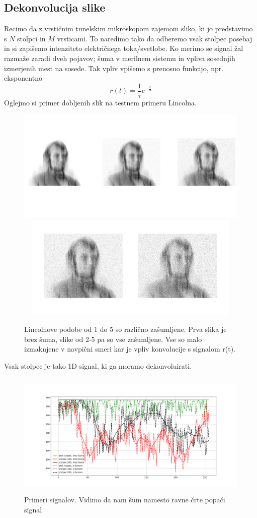\documentclass[11pt, a4paper]{article}
\begin{document}
\subsection{Dekonvolucija slike}
Recimo da z vrstičnim tunelskim mikroskopom zajemom sliko, ki jo predstavimo s $N$ stolpci in $M$ vrsticami. To naredimo tako da odberemo vsak stolpec posebaj in si zapišemo intenziteto električnega toka/svetlobe. Ko merimo se signal žal razmaže zaradi dveh pojavov; šuma v merilnem sistemu in vpliva sosednjih izmerjenih mest na sosede. Tak vpliv vpišemo s prenosno funkcijo, npr. eksponentno
\begin{equation}
r(t) = \frac{1}{\tau} e^{-\frac{t}{\tau}}
\end{equation}
Oglejmo si primer dobljenih slik na testnem primeru Lincolna.
\begin{figure}[H]
\centering
\includegraphics[width=16cm]{tretja_prvi.png}
\includegraphics[width=13cm, height=5cm]{tretja_prvi1.png}
\caption{Lincolnove podobe od 1 do 5 so različno zašumljene. Prva slika je brez šuma, slike od 2-5 pa so vse zašumljene. Vse so malo izmaknjene v navpični smeri kar je vpliv konvolucije s signalom r(t).}  
\end{figure}
Vsak stolpec je tako 1D signal, ki ga moramo dekonvoluirati.
\begin{figure}[H]
\centering
\includegraphics[width=18cm, height=6cm]{tretja_prvi2.png}
\caption{Primeri signalov. Vidimo da nam šum namesto ravne črte popači signal}  
\end{figure}
\end{document}
